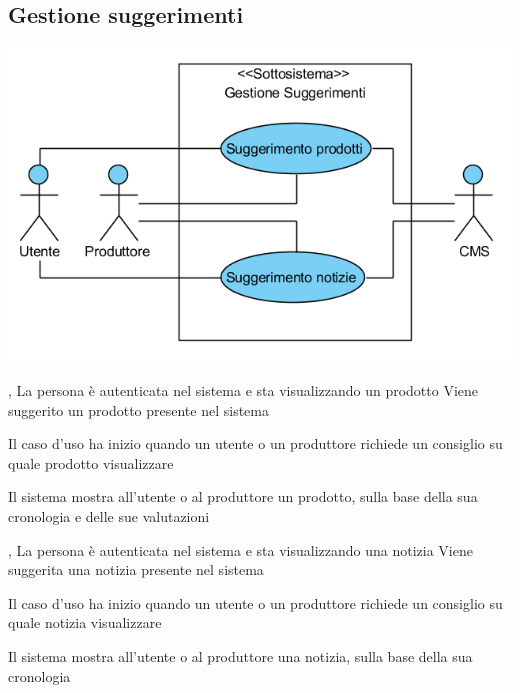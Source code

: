 \subsection{Gestione suggerimenti}
\begin{center}
   \includegraphics[width=\textwidth]{assets/visualParadigm/GestioneSuggerimenti}
\end{center}
{, }
{La persona è autenticata nel sistema e sta visualizzando un prodotto}
{Viene suggerito un prodotto presente nel sistema}
{\begin{enumCU}
	\item Il caso d'uso ha inizio quando un utente o un produttore richiede un consiglio su quale prodotto visualizzare
	\item Il sistema mostra all'utente o al produttore un prodotto, sulla base della sua cronologia e delle sue valutazioni
\end{enumCU}}

\tabcuvspace

{, }
{La persona è autenticata nel sistema e sta visualizzando una notizia}
{Viene suggerita una notizia presente nel sistema}
{\begin{enumCU}
	\item Il caso d'uso ha inizio quando un utente o un produttore richiede un consiglio su quale notizia visualizzare
	\item Il sistema mostra all'utente o al produttore una notizia, sulla base della sua cronologia
\end{enumCU}}

